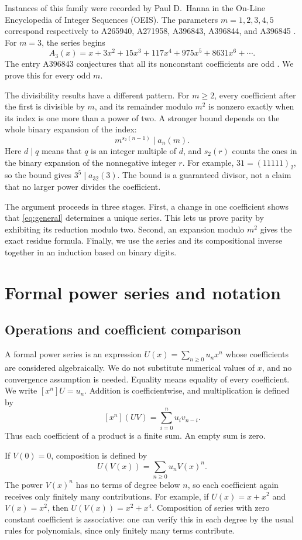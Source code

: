 \documentclass[11pt,a4paper]{article}
\theoremstyle{remark}
\begin{document}
Instances of this family were recorded by Paul D.\ Hanna in the On-Line
Encyclopedia of Integer Sequences (OEIS). The parameters $m=1,2,3,4,5$
correspond respectively to A265940, A271958, A396843, A396844, and A396845
\cite{oeis1,oeis2,oeis3,oeis4,oeis5}. For $m=3$, the series begins
\[
 A_3(x)=x+3x^2+15x^3+117x^4+975x^5+8631x^6+\cdots.
\]
The entry A396843 conjectures that all its nonconstant coefficients are odd
\cite{oeis3}. We prove this for every odd $m$.

The divisibility results have a different pattern. For $m\ge2$, every
coefficient after the first is divisible by $m$, and its remainder modulo
$m^2$ is nonzero exactly when its index is one more than a power of two.
A stronger bound depends on the whole binary expansion of the index:
\[
 m^{s_2(n-1)}\mid a_n(m).
\]
Here $d\mid q$ means that $q$ is an integer multiple of $d$, and $s_2(r)$
counts the ones in the binary expansion of the nonnegative integer $r$.
For example, $31=(11111)_2$, so the bound gives
$3^5\mid a_{32}(3)$. The bound is a guaranteed divisor, not a claim that
no larger power divides the coefficient.

The argument proceeds in three stages. First, a change in one coefficient
shows that \eqref{eq:general} determines a unique series. This lets us prove
parity by exhibiting its reduction modulo two. Second, an expansion modulo
$m^2$ gives the exact residue formula. Finally, we use the series and its
compositional inverse together in an induction based on binary digits.

\section{Formal power series and notation}\label{sec:prelim}

\subsection{Operations and coefficient comparison}

A formal power series is an expression
$U(x)=\sum_{n\ge0}u_nx^n$ whose coefficients are considered algebraically.
We do not substitute numerical values of $x$, and no convergence assumption
is needed. Equality means equality of every coefficient. We write
$[x^n]U=u_n$. Addition is coefficientwise, and multiplication is defined by
\[
 [x^n](UV)=\sum_{i=0}^{n}u_i v_{n-i}.
\]
Thus each coefficient of a product is a finite sum. An empty sum is zero.

If $V(0)=0$, composition is defined by
\[
 U(V(x))=\sum_{n\ge0}u_n V(x)^n.
\]
The power $V(x)^n$ has no terms of degree below $n$, so each coefficient
again receives only finitely many contributions. For example, if
$U(x)=x+x^2$ and $V(x)=x^2$, then $U(V(x))=x^2+x^4$.
Composition of series with zero constant coefficient is associative:
one can verify this in each degree by the usual rules for polynomials,
since only finitely many terms contribute.
\end{document}
